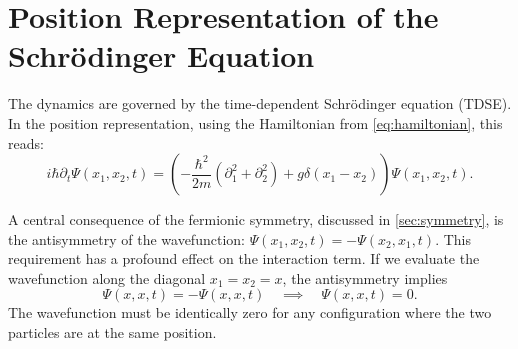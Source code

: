 \section{Position Representation of the Schrödinger Equation}

The dynamics are governed by the time-dependent Schrödinger equation (TDSE).
In the position representation, using the Hamiltonian from
\cref{eq:hamiltonian}, this reads:
\begin{equation} \label{eq:tdse}
	i\hbar\partial_t\Psi(x_1, x_2, t) = \left(
		-\frac{\hbar^2}{2m}(\partial_{1}^2 + \partial_{2}^2) + g\delta(x_1 - x_2)
	\right) \Psi(x_1, x_2, t).
\end{equation}

A central consequence of the fermionic symmetry, discussed in
\cref{sec:symmetry}, is the antisymmetry of the wavefunction:
$\Psi(x_1, x_2, t) = -\Psi(x_2, x_1, t)$.
This requirement has a profound effect on the interaction term.
If we evaluate the wavefunction along the diagonal $x_1 = x_2 = x$,
the antisymmetry implies
\begin{equation}
	\Psi(x, x, t) = -\Psi(x, x, t) \quad \implies \quad \Psi(x, x, t) = 0.
\end{equation}
The wavefunction must be identically zero for any configuration where
the two particles are at the same position.


